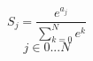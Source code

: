 \documentclass{article}
\begin{document}
\[ S_{j}= \frac{e^{a_{j}}}{\sum_{k=0}^{N}e^k} \]
\[j  \in  0...N \]
\end{document}
